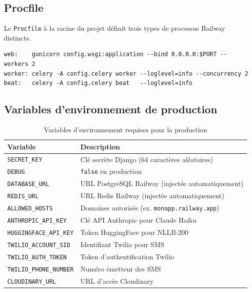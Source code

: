\documentclass[12pt,a4paper,twoside]{report}
\begin{document}
\subsection{Procfile}

Le \texttt{Procfile} à la racine du projet définit trois types de processus
Railway distincts.

\begin{lstlisting}[style=bashstyle, caption={Procfile --- 3 processus Railway}]
web:    gunicorn config.wsgi:application --bind 0.0.0.0:$PORT --workers 2
worker: celery -A config.celery worker --loglevel=info --concurrency 2
beat:   celery -A config.celery beat   --loglevel=info
\end{lstlisting}

\subsection{Variables d'environnement de production}

\begin{table}[H]
\centering
\caption{Variables d'environnement requises pour la production}
\label{tab:env_vars}
\begin{tabular}{L{5cm}L{8.5cm}}
\toprule
\textbf{Variable} & \textbf{Description} \\
\midrule
\texttt{SECRET\_KEY}          & Clé secrète Django (64 caractères aléatoires) \\
\texttt{DEBUG}                & \texttt{false} en production \\
\texttt{DATABASE\_URL}        & URL PostgreSQL Railway (injectée automatiquement) \\
\texttt{REDIS\_URL}           & URL Redis Railway (injectée automatiquement) \\
\texttt{ALLOWED\_HOSTS}       & Domaines autorisés (ex. \texttt{monapp.railway.app}) \\
\texttt{ANTHROPIC\_API\_KEY}  & Clé API Anthropic pour Claude Haiku \\
\texttt{HUGGINGFACE\_API\_KEY} & Token HuggingFace pour NLLB-200 \\
\texttt{TWILIO\_ACCOUNT\_SID} & Identifiant Twilio pour SMS~\cite{twilio2024sms} \\
\texttt{TWILIO\_AUTH\_TOKEN}  & Token d'authentification Twilio \\
\texttt{TWILIO\_PHONE\_NUMBER} & Numéro émetteur des SMS \\
\texttt{CLOUDINARY\_URL}      & URL d'accès Cloudinary~\cite{cloudinary2024docs} \\
\bottomrule
\end{tabular}
\end{table}
\end{document}
